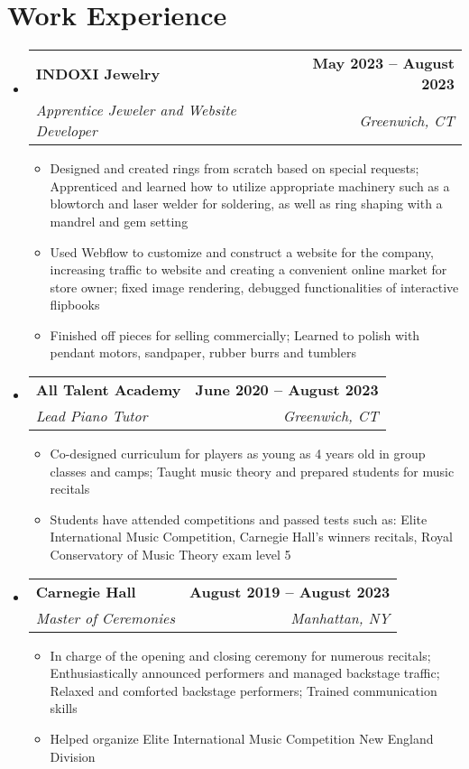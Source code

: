 \documentclass[letterpaper,11pt]{article}
\makeatletter
\newcommand{\resumeItem}[1]{
  \item\small{
    {#1 \vspace{-2pt}}
  }
}
\newcommand{\resumeSubheading}[4]{
  \vspace{-2pt}\item
    \begin{tabular*}{1.0\textwidth}[t]{l@{\extracolsep{\fill}}r}
      \textbf{#1} & \textbf{\small #2} \\
      \textit{\small#3} & \textit{\small #4} \\
    \end{tabular*}\vspace{-7pt}
}
\newcommand{\resumeSubHeadingListStart}{\begin{itemize}[leftmargin=0.0in, label={}]}
\newcommand{\resumeSubHeadingListEnd}{\end{itemize}}
\newcommand{\resumeItemListStart}{\begin{itemize}}
\newcommand{\resumeItemListEnd}{\end{itemize}\vspace{-5pt}}
\makeatother
\begin{document}
\section{Work Experience}
  \resumeSubHeadingListStart

    \resumeSubheading
      {INDOXI Jewelry}{May 2023 -- August 2023}
      {Apprentice Jeweler and Website Developer}{Greenwich, CT}
      \resumeItemListStart
        \resumeItem{Designed and created rings from scratch based on special requests; Apprenticed and learned how to utilize appropriate machinery such as a blowtorch and laser welder for soldering, as well as ring shaping with a mandrel and gem setting}
        \resumeItem{Used Webflow to customize and construct a website for the company, increasing traffic to website and creating a convenient online market for store owner; fixed image rendering, debugged functionalities of interactive flipbooks}
        \resumeItem{Finished off pieces for selling commercially; Learned to polish with pendant motors, sandpaper, rubber burrs and tumblers}
      \resumeItemListEnd

    \resumeSubheading
      {All Talent Academy}{June 2020 -- August 2023}
      {Lead Piano Tutor}{Greenwich, CT}
      \resumeItemListStart
        \resumeItem{Co-designed curriculum for players as young as 4 years old in group classes and camps; Taught music theory and prepared students for music recitals}
        \resumeItem{Students have attended competitions and passed tests such as: Elite International Music Competition,
        Carnegie Hall's winners recitals, Royal Conservatory of Music Theory exam level 5}
    \resumeItemListEnd

    \resumeSubheading
      {Carnegie Hall}{August 2019 -- August 2023}
      {Master of Ceremonies}{Manhattan, NY}
      \resumeItemListStart
        \resumeItem{In charge of the opening and closing ceremony for numerous recitals; Enthusiastically announced performers and managed backstage traffic; Relaxed and comforted backstage performers; Trained communication skills}
        \resumeItem{Helped organize Elite International Music Competition New England Division}
    \resumeItemListEnd
    
  \resumeSubHeadingListEnd
\vspace{-16pt}

\end{document}
